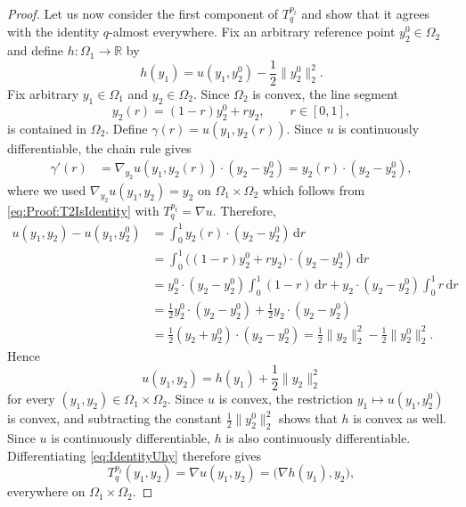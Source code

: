 \documentclass[oneside,11pt]{article}
\theoremstyle{remark}
\newcommand{\R}{\mathbb{R}}
\begin{document}
\begin{proof}
Let us now consider the first component of $T_q^{p_t}$ and show that it agrees with the identity $q$-almost everywhere. Fix an arbitrary reference point $y_2^0\in\Omega_2$ and define
$h:\Omega_1\to\R$ by
\[
    h(y_1)
    =
    u(y_1,y_2^0)
    -
    \frac12\|y_2^0\|_2^2.
\]
Fix arbitrary $y_1\in\Omega_1$ and $y_2\in\Omega_2$. Since $\Omega_2$
is convex, the line segment
\[
    y_2(r)=(1-r)y_2^0+ry_2,
    \qquad r\in[0,1],
\]
is contained in $\Omega_2$. Define
$\gamma(r)=u(y_1,y_2(r))$. Since $u$ is continuously differentiable, the chain rule gives
\begin{align*}
    \gamma'(r)
    &=
    \nabla_{y_2}u(y_1,y_2(r))
    \cdot
    (y_2-y_2^0) =
    y_2(r)\cdot(y_2-y_2^0),
\end{align*}
where we used
$\nabla_{y_2}u(y_1,y_2)=y_2$ on
$\Omega_1\times\Omega_2$ which follows from \eqref{eq:Proof:T2IsIdentity} with $T_{q}^{p_t} = \nabla u$. Therefore,
\begin{align*}
    u(y_1,y_2)-u(y_1,y_2^0)
    &= \int_0^1 y_2(r)\cdot(y_2-y_2^0)\,\mathrm dr \\
    &= \int_0^1 \bigl((1-r)y_2^0+ry_2\bigr)\cdot(y_2-y_2^0)\,\mathrm dr \\
    &= y_2^0\cdot(y_2-y_2^0)\int_0^1(1-r)\,\mathrm dr
       + y_2\cdot(y_2-y_2^0)\int_0^1r\,\mathrm dr \\
    &= \frac12 y_2^0\cdot(y_2-y_2^0)
       + \frac12 y_2\cdot(y_2-y_2^0) \\
    &= \frac12 (y_2+y_2^0)\cdot(y_2-y_2^0)
     = \frac12\|y_2\|_2^2-\frac12\|y_2^0\|_2^2.
\end{align*}
Hence
\begin{equation}\label{eq:IdentityUhy}
    u(y_1,y_2)
    =
    h(y_1)
    +
    \frac12\|y_2\|_2^2
\end{equation}
for every $(y_1,y_2)\in\Omega_1\times\Omega_2$.
Since $u$ is convex, the restriction $y_1\mapsto u(y_1,y_2^0)$ is convex, and subtracting the constant $\frac12\|y_2^0\|_2^2$ shows that $h$ is convex as well.
Since $u$ is continuously differentiable, $h$ is also continuously differentiable. Differentiating \eqref{eq:IdentityUhy} therefore gives
\[
    T_q^{p_t}(y_1,y_2)
    =
    \nabla u(y_1,y_2)
    =
    \bigl(
        \nabla h(y_1),
        y_2
    \bigr),
\]
everywhere on $\Omega_1 \times \Omega_2$. 


\end{proof}
\end{document}
